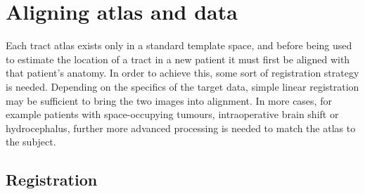 \chapter{Aligning atlas and data}

Each tract atlas exists only in a standard template space, and before being used to estimate the location of a tract in a new patient it must first be aligned with that patient's anatomy.
In order to achieve this, some sort of registration strategy is needed.
Depending on the specifics of the target data, simple linear registration may be sufficient to bring the two images into alignment.
In more  cases, for example patients with space-occupying tumours, intraoperative brain shift or hydrocephalus, further more advanced processing is needed to match the atlas to the subject.

\section{Registration}


